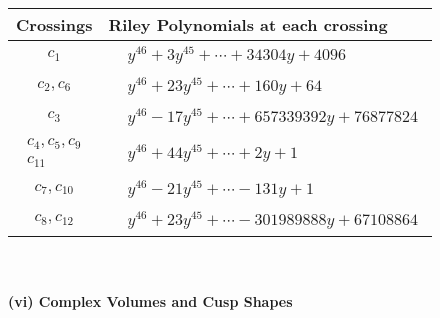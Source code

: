 \documentclass[1p]{elsarticle_modified}
\theoremstyle{definition}
\begin{document}
\begin{tabular}{m{50pt}|m{274pt}}
Crossings & \hspace{64pt}Riley Polynomials at each crossing \\
\hline $$\begin{aligned}c_{1}\end{aligned}$$&$\begin{aligned}
&y^{46}+3 y^{45}+\cdots+34304 y+4096
\end{aligned}$\\
\hline $$\begin{aligned}c_{2},c_{6}\end{aligned}$$&$\begin{aligned}
&y^{46}+23 y^{45}+\cdots+160 y+64
\end{aligned}$\\
\hline $$\begin{aligned}c_{3}\end{aligned}$$&$\begin{aligned}
&y^{46}-17 y^{45}+\cdots+657339392 y+76877824
\end{aligned}$\\
\hline $$\begin{aligned}c_{4},c_{5},c_{9}\\c_{11}\end{aligned}$$&$\begin{aligned}
&y^{46}+44 y^{45}+\cdots+2 y+1
\end{aligned}$\\
\hline $$\begin{aligned}c_{7},c_{10}\end{aligned}$$&$\begin{aligned}
&y^{46}-21 y^{45}+\cdots-131 y+1
\end{aligned}$\\
\hline $$\begin{aligned}c_{8},c_{12}\end{aligned}$$&$\begin{aligned}
&y^{46}+23 y^{45}+\cdots-301989888 y+67108864
\end{aligned}$\\
\hline
\end{tabular}\\~\\
\newpage\flushleft \textbf{(vi) Complex Volumes and Cusp Shapes}
\end{document}
